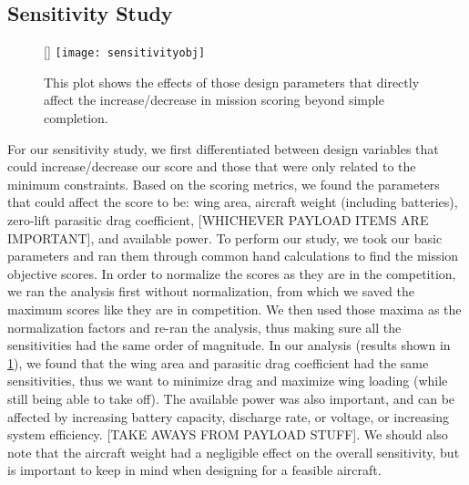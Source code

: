 \documentclass[proposal]{byu-aero}
\begin{document}
\lipsum[1-4]


\subsection{Sensitivity Study}
\label{ssec:SensitivityStudy}

\begin{figure}
	\centering
	\raisebox{0pt}[\dimexpr{}\baselineskip\relax]{
		\texttt{[image: sensitivityobj]}
	}
	\caption{This plot shows the effects of those design parameters that directly affect the increase/decrease in mission scoring beyond simple completion.}
	\label{fig:sensitivity}
\end{figure}
For our sensitivity study, we first differentiated between design variables that could increase/decrease our score and those that were only related to the minimum constraints.  Based on the scoring metrics, we found the parameters that could affect the score to be: wing area, aircraft weight (including batteries), zero-lift parasitic drag coefficient, {\color{BYUred}[WHICHEVER PAYLOAD ITEMS ARE IMPORTANT]}, and available power.  To perform our study, we took our basic parameters and ran them through common hand calculations to find the mission objective scores. In order to normalize the scores as they are in the competition, we ran the analysis first without normalization, from which we saved the maximum scores like they are in competition. We then used those maxima as the normalization factors and re-ran the analysis, thus making sure all the sensitivities had the same order of magnitude.  In our analysis (results shown in \cref{fig:sensitivity}), we found that the wing area and parasitic drag coefficient had the same sensitivities, thus we want to minimize drag and maximize wing loading (while still being able to take off).  The available power was also important, and can be affected by increasing battery capacity, discharge rate, or voltage, or increasing system efficiency. {\color{BYUred}[TAKE AWAYS FROM PAYLOAD STUFF]}. We should also note that the aircraft weight had a negligible effect on the overall sensitivity, but is important to keep in mind when designing for a feasible aircraft.
\end{document}
